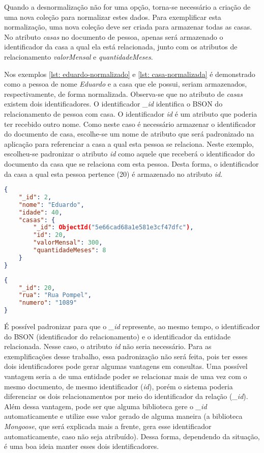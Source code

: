 Quando a desnormalização não for uma opção, torna-se necessário a criação de uma nova coleção para normalizar estes dados. Para exemplificar esta normalização, uma nova coleção deve ser criada para armazenar todas as casas. No atributo \textit{casas} no documento de pessoa, apenas será armazenado o identificador da casa a qual ela está relacionada, junto com os atributos de relacionamento \textit{valorMensal} e \textit{quantidadeMeses}. 

Nos exemplos \ref{lst: eduardo-normalizado} e \ref{lst: casa-normalizada} é demonstrado como a pessoa de nome \textit{Eduardo} e a casa que ele possui, seriam armazenados, respectivamente, de forma normalizada. Observa-se que no atributo de \textit{casas} existem dois identificadores. O identificador \textit{\_id} identifica o BSON do relacionamento de pessoa com casa. O identificador \textit{id} é um atributo que poderia ter recebido outro nome. Como neste caso é necessário armazenar o identificador do documento de casa, escolhe-se um nome de atributo que será padronizado na aplicação para referenciar a casa a qual esta pessoa se relaciona. Neste exemplo, escolheu-se padronizar o atributo \textit{id} como aquele que receberá o identificador do documento da casa que se relaciona com esta pessoa. Desta forma, o identificador da casa a qual esta pessoa pertence (20) é armazenado no atributo \textit{id}. 
    
\begin{lstlisting}[language=json, caption={Estrutura de Dados Normalizados da pessoa \textit{Eduardo}\label{lst: eduardo-normalizado}}]
{
    "_id": 2,
    "nome": "Eduardo",
    "idade": 40,
    "casas": {
        "_id": ObjectId("5e66cad68a1e581e3cf47dfc"),
        "id": 20,
        "valorMensal": 300,
        "quantidadeMeses": 8
    }
}
\end{lstlisting}

\begin{lstlisting}[language=json, caption={Estrutura de Dados Normalizados de uma casa\label{lst: casa-normalizada}}]
{
    "_id": 20,
    "rua": "Rua Pompel",
    "numero": "1089"
}
\end{lstlisting}

É possível padronizar para que o \textit{\_id} represente, ao mesmo tempo, o identificador do BSON (identificador do relacionamento) e o identificador da entidade relacionada. Nesse caso, o atributo \textit{id} não seria necessário. Para as exemplificações desse trabalho, essa padronização não será feita, pois ter esses dois identificadores pode gerar algumas vantagens em consultas. Uma possível vantagem seria a de uma entidade poder se relacionar mais de uma vez com o mesmo documento, de mesmo identificador (\textit{id}), porém o sistema poderia diferenciar os dois relacionamentos por meio do identificador da relação (\textit{\_id}). Além dessa vantagem, pode ser que alguma biblioteca gere o \textit{\_id} automaticamente e utilize esse valor gerado de alguma maneira (a biblioteca \textit{Mongoose}, que será explicada mais a frente, gera esse identificador automaticamente, caso não seja atribuído). Dessa forma, dependendo da situação, é uma boa ideia manter esses dois identificadores.
    
